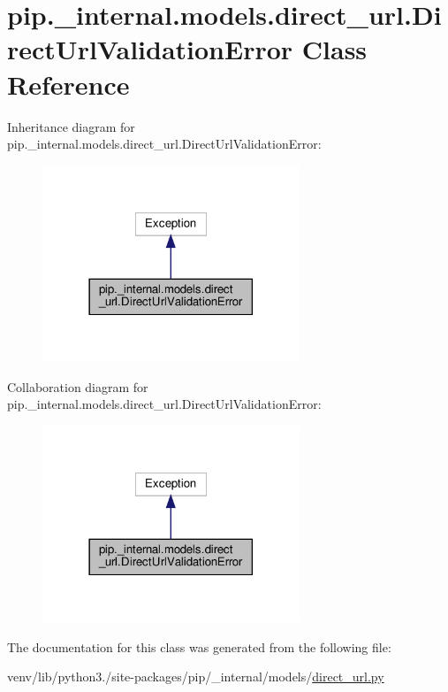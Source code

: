 \hypertarget{classpip_1_1__internal_1_1models_1_1direct__url_1_1DirectUrlValidationError}{}\section{pip.\+\_\+internal.\+models.\+direct\+\_\+url.\+Direct\+Url\+Validation\+Error Class Reference}
\label{classpip_1_1__internal_1_1models_1_1direct__url_1_1DirectUrlValidationError}


Inheritance diagram for pip.\+\_\+internal.\+models.\+direct\+\_\+url.\+Direct\+Url\+Validation\+Error\+:
\nopagebreak
\begin{figure}[H]
\begin{center}
\leavevmode
\includegraphics[width=218pt]{classpip_1_1__internal_1_1models_1_1direct__url_1_1DirectUrlValidationError__inherit__graph}
\end{center}
\end{figure}


Collaboration diagram for pip.\+\_\+internal.\+models.\+direct\+\_\+url.\+Direct\+Url\+Validation\+Error\+:
\nopagebreak
\begin{figure}[H]
\begin{center}
\leavevmode
\includegraphics[width=218pt]{classpip_1_1__internal_1_1models_1_1direct__url_1_1DirectUrlValidationError__coll__graph}
\end{center}
\end{figure}


The documentation for this class was generated from the following file\+:\begin{DoxyCompactItemize}
\item 
venv/lib/python3./site-\/packages/pip/\+\_\+internal/models/\hyperlink{direct__url_8py}{direct\+\_\+url.\+py}\end{DoxyCompactItemize}
